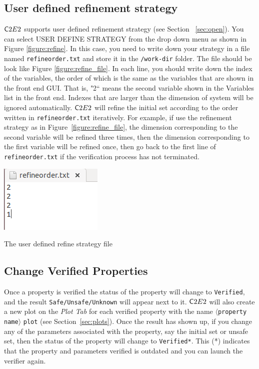 \documentclass{tufte-book} %
\begin{document}
\subsection{User defined refinement strategy}\label{sec:refinement_defined}
${{\mathsf C2E2}}$ supports user defined refinement strategy (see Section ~\ref{sec:open}). You can select USER DEFINE STRATEGY from the drop down menu as shown in Figure \ref{figure:refine}. In this case, you need to write down your strategy in a file named \texttt{refineorder.txt} and store it in the \texttt{/work-dir} folder. The file should be look like Figure \ref{figure:refine_file}. In each line, you should write down the index of the variables, the order of which is the same as the variables that are shown in the front end GUI. That is, "2`` means the second variable shown in the Variables list in the front end. Indexes that are larger than the dimension of system will be ignored automatically. ${{\mathsf C2E2}}$ will refine the initial set according to the order written in \texttt{refineorder.txt} iteratively. For example, if use the refinement strategy as in Figure~\ref{figure:refine_file}, the dimension corresponding to the second variable will be refined three times, then the dimension corresponding to the first variable will be refined once, then go back to the first line of \texttt{refineorder.txt} if the verification process has not terminated.

\begin{marginfigure}
 \centerline{\includegraphics[scale=.25,keepaspectratio=true]{Figures/refine_order.png}}
 \caption{The user defined refine strategy file} 
  \label{figure:refine_file}
\end{marginfigure}


\subsection{Change Verified Properties}
Once a property is verified the status of the property will change to \texttt{Verified}, and the result \texttt{Safe/Unsafe/Unknown} will appear next to it. ${{\mathsf C2E2}}$ will also create a new plot on the \emph{Plot Tab} for each verified property with the name $\langle$\texttt{property name}$\rangle$ \texttt{plot} (see Section~\ref{sec:plots}).  Once the result has shown up, if you change any of the parameters associated with the property, say the initial set or unsafe set, then the status of the property will change to \texttt{Verified*}. This (*) indicates that the property and parameters verified is outdated and you can launch the verifier again.
\end{document}
